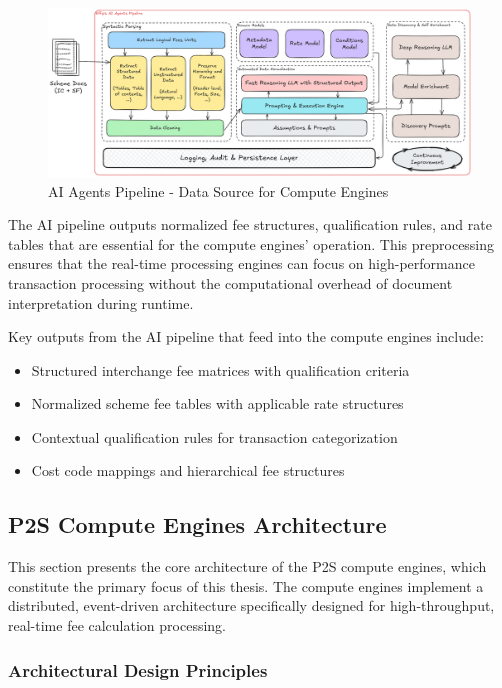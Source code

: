 \begin{figure}[H]
    \centering
    \includegraphics[width=\textwidth]{img/arch/pipeline_design.png}
    \caption{AI Agents Pipeline - Data Source for Compute Engines}
    \label{fig:ai_pipeline_architecture}
\end{figure}

The AI pipeline outputs normalized fee structures, qualification rules, and rate tables that are essential for the compute engines' operation. This preprocessing ensures that the real-time processing engines can focus on high-performance transaction processing without the computational overhead of document interpretation during runtime.

Key outputs from the AI pipeline that feed into the compute engines include:
\begin{itemize}
    \item Structured interchange fee matrices with qualification criteria
    \item Normalized scheme fee tables with applicable rate structures  
    \item Contextual qualification rules for transaction categorization
    \item Cost code mappings and hierarchical fee structures
\end{itemize}

\subsection{P2S Compute Engines Architecture}

This section presents the core architecture of the P2S compute engines, which constitute the primary focus of this thesis. The compute engines implement a distributed, event-driven architecture specifically designed for high-throughput, real-time fee calculation processing.

\subsubsection{Architectural Design Principles}

